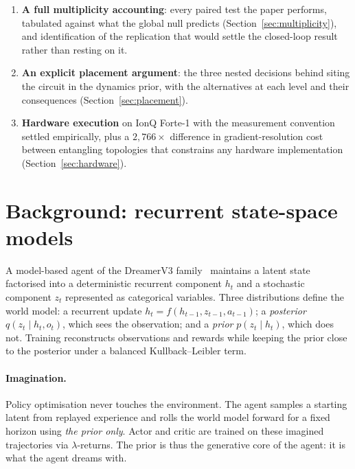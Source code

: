 \documentclass[11pt,onecolumn]{article}
\begin{document}
\begin{enumerate}
\item \textbf{A full multiplicity accounting}: every paired test the
      paper performs, tabulated against what the global null predicts
      (Section~\ref{sec:multiplicity}), and identification of the
      replication that would settle the closed-loop result rather than
      resting on it.
\item \textbf{An explicit placement argument}: the three nested
      decisions behind siting the circuit in the dynamics prior, with
      the alternatives at each level and their consequences
      (Section~\ref{sec:placement}).
\item \textbf{Hardware execution} on IonQ Forte-1 with the measurement
      convention settled empirically, plus a $2{,}766\times$ difference
      in gradient-resolution cost between entangling topologies that
      constrains any hardware implementation
      (Section~\ref{sec:hardware}).
\end{enumerate}

\section{Background: recurrent state-space models}
A model-based agent of the DreamerV3 family~\cite{hafner2023} maintains
a latent state factorised into a deterministic recurrent component
$h_t$ and a stochastic component $z_t$ represented as categorical
variables. Three distributions define the world model: a recurrent
update $h_t = f(h_{t-1}, z_{t-1}, a_{t-1})$; a \emph{posterior}
$q(z_t \mid h_t, o_t)$, which sees the observation; and a \emph{prior}
$p(z_t \mid h_t)$, which does not. Training reconstructs observations
and rewards while keeping the prior close to the posterior under a
balanced Kullback--Leibler term.

\paragraph{Imagination.}
Policy optimisation never touches the environment. The agent samples a
starting latent from replayed experience and rolls the world model
forward for a fixed horizon using \emph{the prior only}. Actor and
critic are trained on these imagined trajectories via
$\lambda$-returns. The prior is thus the generative core of the agent:
it is what the agent dreams with.
\end{document}
